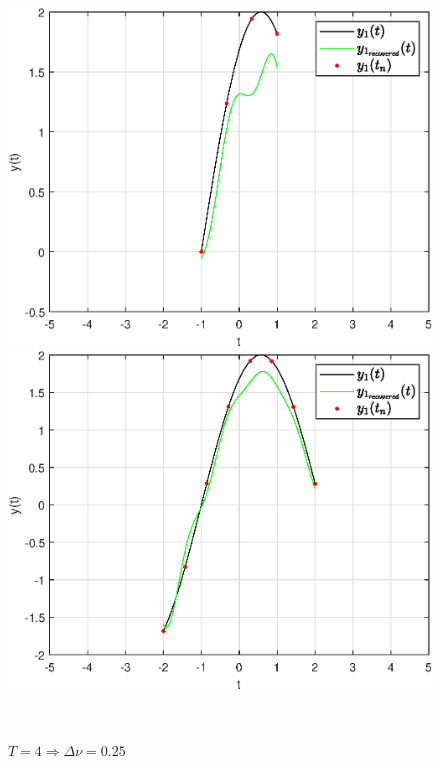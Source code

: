 \documentclass[a4paper]{article}
\begin{document}
\begin{figure}[H]
    \begin{minipage}{0.5\textwidth}
        \centering \includegraphics[width=\textwidth]{graphs2/T_2_dt_0.5_B_1_dv_0.5/func1_recovered.eps}
        \caption{$T = 2 \Rightarrow \Delta \nu = 0.5$}
    \end{minipage}\hfill
    \begin{minipage}{0.5\textwidth}
        \centering \includegraphics[width=\textwidth]{graphs2/T_4_dt_0.5_B_1_dv_0.25/func1_recovered.eps}
        \caption{$T = 4 \Rightarrow \Delta \nu = 0.25$}
    \end{minipage}\\[1em]
\end{figure}\noindent\
\end{document}
